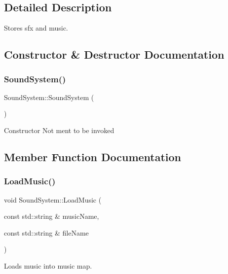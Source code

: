\subsection{Detailed Description}
Stores sfx and music. 

\subsection{Constructor \& Destructor Documentation}
\mbox{\label{class_sound_system_abcef3503c51f6ccd300a821131afc366}} 
\subsubsection{\texorpdfstring{Sound\+System()}{SoundSystem()}}
{\footnotesize\ttfamily Sound\+System\+::\+Sound\+System (\begin{DoxyParamCaption}{ }\end{DoxyParamCaption})\hspace{0.3cm}{\ttfamily [delete]}}

Constructor Not ment to be invoked 

\subsection{Member Function Documentation}
\mbox{\label{class_sound_system_a9e305a909ac0b2773dc9c888226b183d}} 
\subsubsection{\texorpdfstring{Load\+Music()}{LoadMusic()}}
{\footnotesize\ttfamily void Sound\+System\+::\+Load\+Music (\begin{DoxyParamCaption}\item[{const std\+::string \&}]{music\+Name,  }\item[{const std\+::string \&}]{file\+Name }\end{DoxyParamCaption})\hspace{0.3cm}{\ttfamily [static]}}



Loads music into music map. 


